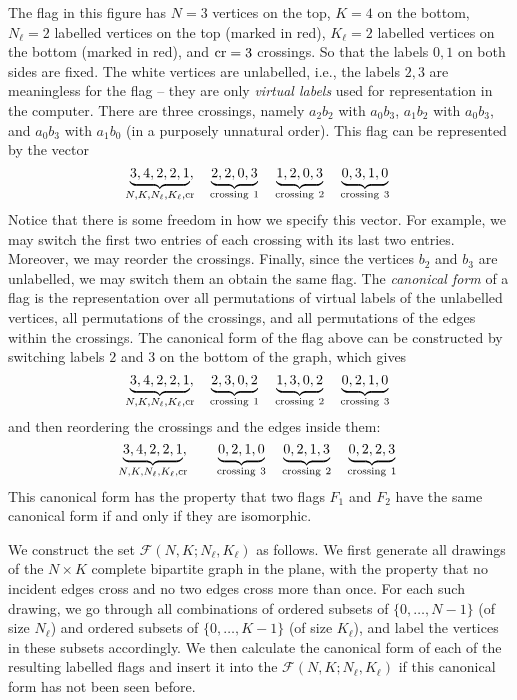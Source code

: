 \documentclass{article}
\def\cF{\mathcal{F}}
\begin{document}
The flag in this figure has $N=3$ vertices on the top, $K = 4$ on the bottom, $N_\ell = 2$ labelled vertices on the top (marked in red), $K_\ell=2$ labelled vertices on the bottom (marked in red), and ${\rm cr} = 3$ crossings.
So that the labels $0, 1$ on both sides are fixed. The white vertices are unlabelled, i.e., the labels $2, 3$ are meaningless for the flag -- they are only \textit{virtual labels} used for representation in the computer. There are three crossings, namely $a_2b_2$ with $a_0b_3$, $a_1b_2$ with $a_0b_3$, and $a_0b_3$ with $a_1b_0$
(in a purposely unnatural order).
This flag can be represented by the vector
\[
\underbrace{3, 4, 2, 2, 1}_{\mathclap{N, K, N_\ell, K_\ell, {\rm cr}}}, 
\quad \underbrace{2, 2, 0, 3}_{\rm crossing\ 1}
\quad \underbrace{1, 2, 0, 3}_{\rm crossing\ 2}
\quad \underbrace{0, 3, 1, 0}_{\rm crossing\ 3}
\]
Notice that there is some freedom in how we specify this vector. For example, we may switch the first two entries of each crossing with its last two entries. Moreover, we may reorder the crossings. Finally, since the vertices $b_2$ and $b_3$ are unlabelled, we may switch them an obtain the same flag. 
The \textit{canonical form} of a flag is the representation over all permutations of virtual labels of the unlabelled vertices, all permutations of the crossings, and all permutations of the edges within the crossings. The canonical form of the flag above can be constructed by switching labels $2$ and $3$ on the bottom of the graph, which gives
\[
\underbrace{3, 4, 2, 2, 1}_{\mathclap{N, K, N_\ell, K_\ell, {\rm cr}}}, 
\quad \underbrace{2, 3, 0, 2}_{\rm crossing\ 1}
\quad \underbrace{1, 3, 0, 2}_{\rm crossing\ 2}
\quad \underbrace{0, 2, 1, 0}_{\rm crossing\ 3}
\]
and then reordering the crossings and the edges inside them:
\[
\underbrace{3, 4, 2, 2, 1}_{\mathclap{N, K, N_\ell, K_\ell, {\rm cr}}}, \quad 
\quad \underbrace{0, 2, 1, 0}_{\rm crossing\ 3}
\quad \underbrace{0, 2, 1, 3}_{\rm crossing\ 2}
\quad \underbrace{0, 2, 2, 3}_{\rm crossing\ 1}
\]
This canonical form has the property that two flags $F_1$ and $F_2$ have the same canonical form if and only if they are isomorphic.

We construct the set $\cF(N, K; N_\ell, K_\ell)$ as follows. We first generate all drawings of the  $N\times K$ complete bipartite graph in the plane, with the property that no incident edges cross and no two edges cross more than once. For each such drawing, we go through all combinations of ordered subsets of $\{0, \hdots, N-1\}$ (of size $N_\ell$) and ordered subsets of $\{0, \hdots, K-1\}$ (of size $K_\ell$), and label the vertices in these subsets accordingly. We then calculate the canonical form of each of the resulting labelled flags and insert it into the $\cF(N, K; N_\ell, K_\ell)$ if this canonical form has not been seen before. 
\end{document}
